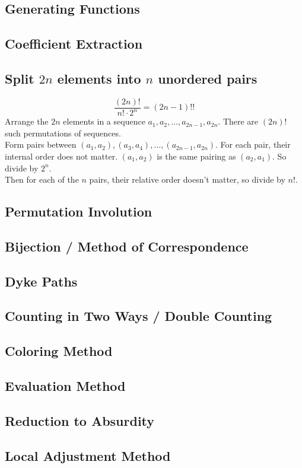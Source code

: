 \documentclass[12pt]{extarticle}
\begin{document}
\subsection*{Generating Functions}
\subsection*{Coefficient Extraction}
\subsection*{Split $2n$ elements into $n$ unordered pairs}
$$\frac{(2n)!}{n!\cdot 2^{n}}=(2n-1)!!$$
Arrange the $2n$ elements in a sequence $a_{1},a_{2},\dots,a_{2n-1},a_{2n}$. There are $(2n)!$ such permutations of sequences. \\
Form pairs between $(a_{1}, a_{2}), (a_{3},a_{4}),\dots,(a_{2n-1},a_{2n})$. For each pair, their internal order does not matter. $(a_{1},a_{2})$ is the same pairing as $(a_{2},a_{1})$. So divide  by $2^{n}$.\\
Then for each of the $n$ pairs, their relative order doesn't matter, so divide by $n!$.
\subsection*{Permutation Involution}
\subsection*{Bijection / Method of Correspondence}
\subsection*{Dyke Paths}
\subsection*{Counting in Two Ways / Double Counting}
\subsection*{Coloring Method}
\subsection*{Evaluation Method}
\subsection*{Reduction to Absurdity}
\subsection*{Local Adjustment Method}
\end{document}
